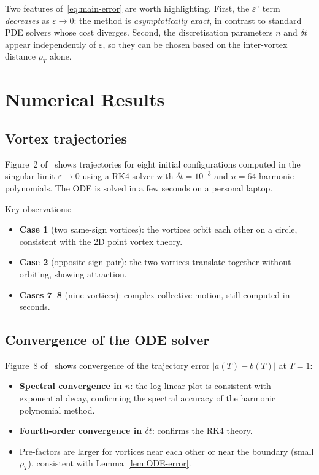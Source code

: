 \documentclass[12pt, a4paper]{article}
\theoremstyle{plain}
\theoremstyle{definition}
\newcommand{\abs}[1]{\left\lvert #1 \right\rvert}
\begin{document}
Two features of~\eqref{eq:main-error} are worth highlighting.
First, the $\varepsilon^\gamma$ term \emph{decreases} as $\varepsilon \to 0$:
the method is \emph{asymptotically exact}, in contrast to standard PDE solvers
whose cost diverges.
Second, the discretisation parameters $n$ and $\delta t$ appear independently
of $\varepsilon$, so they can be chosen based on the inter-vortex distance $\rho_T$
alone.

\section{Numerical Results}

\subsection{Vortex trajectories}

Figure~2 of~\cite{CorsoKemlinMelcherStamm2024} shows trajectories for
eight initial configurations computed in the singular limit $\varepsilon \to 0$
using a RK4 solver with $\delta t = 10^{-3}$ and $n = 64$ harmonic polynomials.
The ODE is solved in a few seconds on a personal laptop.

Key observations:
\begin{itemize}
  \item \textbf{Case 1} (two same-sign vortices): the vortices orbit
        each other on a circle, consistent with the 2D point vortex theory.
  \item \textbf{Case 2} (opposite-sign pair): the two vortices translate
        together without orbiting, showing attraction.
  \item \textbf{Cases 7--8} (nine vortices): complex collective motion,
        still computed in seconds.
\end{itemize}

\subsection{Convergence of the ODE solver}

Figure~8 of~\cite{CorsoKemlinMelcherStamm2024} shows convergence of the
trajectory error $\abs{a(T) - b(T)}$ at $T = 1$:
\begin{itemize}
  \item \textbf{Spectral convergence in $n$}: the log-linear plot is
        consistent with exponential decay, confirming the spectral accuracy
        of the harmonic polynomial method.
  \item \textbf{Fourth-order convergence in $\delta t$}:
        confirms the RK4 theory.
  \item Pre-factors are larger for vortices near each other or near the
        boundary (small $\rho_T$), consistent with Lemma~\ref{lem:ODE-error}.
\end{itemize}
\end{document}
